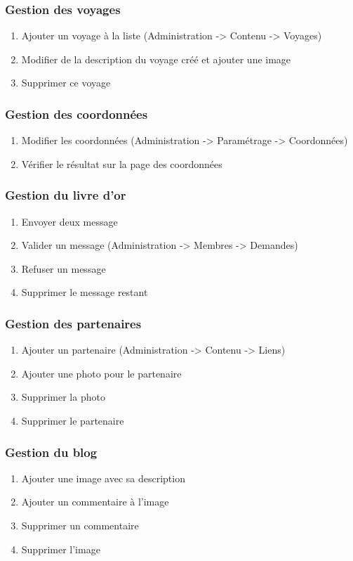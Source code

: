 \documentclass[11pt]{report}
\begin{document}
\subsubsection*{Gestion des voyages}
\begin{enumerate}
\item Ajouter un voyage à la liste (Administration -> Contenu -> Voyages)
\item Modifier de la description du voyage créé et ajouter une image
\item Supprimer ce voyage
\end{enumerate}
\subsubsection*{Gestion des coordonnées}
\begin{enumerate}
\item Modifier les coordonnées (Administration -> Paramétrage -> Coordonnées)
\item Vérifier le résultat sur la page des coordonnées
\end{enumerate}
\subsubsection*{Gestion du livre d’or}
\begin{enumerate}
\item Envoyer deux message
\item Valider un message (Administration -> Membres -> Demandes)
\item Refuser un message
\item Supprimer le message restant
\end{enumerate}
\subsubsection*{Gestion des partenaires}
\begin{enumerate}
\item Ajouter un partenaire (Administration -> Contenu -> Liens)
\item Ajouter une photo pour le partenaire
\item Supprimer la photo
\item Supprimer le partenaire
\end{enumerate}
\subsubsection*{Gestion du blog}
\begin{enumerate}
\item Ajouter une image avec sa description
\item Ajouter un commentaire à l’image
\item Supprimer un commentaire
\item Supprimer l’image
\end{enumerate}
\end{document}
